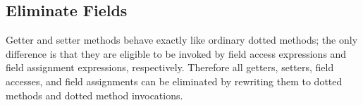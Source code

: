 \subsection{Eliminate Fields}

Getter and setter methods behave exactly like ordinary dotted methods;
the only difference is that they are eligible to be invoked by
field access expressions and field assignment expressions, respectively.
Therefore all getters, setters, field accesses, and field assignments
can be eliminated by rewriting them to dotted methods and dotted method invocations.

